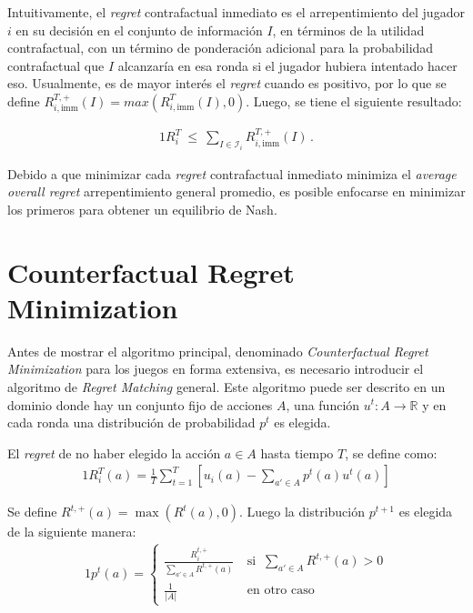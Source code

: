 Intuitivamente, el \textit{regret} contrafactual inmediato es el arrepentimiento del jugador $i$ en su decisión en el conjunto de información $I$, en términos de la utilidad contrafactual, con un término de ponderación adicional para la probabilidad contrafactual que $I$ alcanzaría en esa ronda si el jugador hubiera intentado hacer eso. Usualmente, es de mayor interés el \textit{regret} cuando es positivo, por lo que se define $R_{i, \text{imm}}^{T, +} (I) = max(R^T_{i, \text{imm}} (I), 0)$. Luego, se tiene el siguiente resultado:

\begin{theorem}
\begin{alignat}{1}
R_i^T\ \leq\ \sum_{I \in \mathcal{I}_i} R_{i, \text{imm}}^{T, +}(I) \,.
\end{alignat}
\end{theorem}

Debido a que minimizar cada \textit{regret} contrafactual inmediato minimiza el \textit{average overall regret} arrepentimiento general promedio, es posible enfocarse en minimizar los primeros para obtener un equilibrio de Nash.

\section{Counterfactual Regret Minimization}

Antes de mostrar el algoritmo principal, denominado \textit{Counterfactual Regret Minimization} para los juegos en forma extensiva, es necesario introducir el algoritmo de \textit{Regret Matching} general. Este algoritmo puede ser descrito en un dominio donde hay un conjunto fijo de acciones $A$, una función $u^t : A \rightarrow \mathbb{R}$ y en cada ronda una distribución de probabilidad $p^t$ es elegida.

\begin{definition}
\label{def:regret}
El \textit{regret} de no haber elegido la acción $a \in A$ hasta tiempo $T$, se define como:
\begin{alignat}{1}
R_i^T(a) = \frac{1}{T} \sum_{t = 1}^T \left[u_i(a) - \sum_{a' \in A}p^t(a)u^t(a)\right]
\end{alignat}
\end{definition}

Se define $R^{t, +}(a) = \max(R^t(a), 0)$. Luego la distribución $p^{t+1}$ es elegida de la siguiente manera:
\begin{alignat}{1}
p^t(a) = 
\begin{cases}
\frac{R_i^{t, +}}{\sum_{a' \in A} R^{t, +}(a)}\ & \text{si }\ \sum_{a' \in A} R^{t, +}(a) > 0\\
\frac{1}{|A|}\ & \text{en otro caso}
\end{cases}
\end{alignat}

